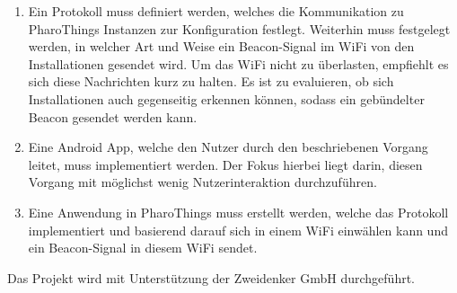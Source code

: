 \documentclass[12pt,a4paper]{article}
\begin{document}
        \begin{enumerate}
            \item Ein Protokoll muss definiert werden, welches die Kommunikation zu PharoThings Instanzen zur Konfiguration festlegt.
            Weiterhin muss festgelegt werden, in welcher Art und Weise ein Beacon-Signal im WiFi von den Installationen gesendet wird.
            Um das WiFi nicht zu überlasten, empfiehlt es sich diese Nachrichten kurz zu halten. Es ist zu evaluieren,
            ob sich Installationen auch gegenseitig erkennen können, sodass ein gebündelter Beacon gesendet werden kann.
            \item Eine Android App, welche den Nutzer durch den beschriebenen Vorgang leitet, muss implementiert werden.
            Der Fokus hierbei liegt darin, diesen Vorgang mit möglichst wenig Nutzerinteraktion durchzuführen.
            \item Eine Anwendung in PharoThings muss erstellt werden, welche das Protokoll implementiert
            und basierend darauf sich in einem WiFi einwählen kann und ein Beacon-Signal in diesem WiFi sendet.
        \end{enumerate}
        Das Projekt wird mit Unterstützung der Zweidenker GmbH durchgeführt.
    \pagebreak
\end{document}
